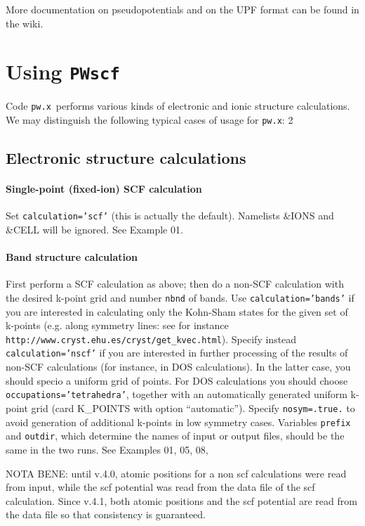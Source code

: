 \documentclass[12pt,a4paper]{article}
\def\pw.x{\texttt{pw.x}}
\def\PWscf{\texttt{PWscf}}
\begin{document}
More documentation on pseudopotentials and on the UPF format
can be found in the wiki.
\section{Using \PWscf}


Code \pw.x\ performs various kinds of electronic and ionic structure 
calculations.
We may distinguish the following typical cases of usage for \pw.x:
2
\subsection{Electronic structure calculations}
\paragraph{Single-point (fixed-ion) SCF calculation} 
Set \texttt{calculation='scf'} (this is actually the default).
Namelists \&IONS and \&CELL will be ignored. See Example 01.

\paragraph{Band structure calculation}
First perform a SCF calculation as above;
then do a non-SCF calculation with the desired k-point grid and 
number \texttt{nbnd} of bands. 
Use \texttt{calculation='bands'} if you are interested in calculating
only the Kohn-Sham states for the given set of k-points
(e.g. along symmetry lines: see for instance
\texttt{http://www.cryst.ehu.es/cryst/get\_kvec.html}). Specify instead
\texttt{calculation='nscf'} if you are interested in further processing 
of the results of non-SCF calculations (for instance, in DOS calculations).
In the latter case, you should specio a uniform grid of points.
For DOS calculations you should choose \texttt{occupations='tetrahedra'}, 
together with an automatically generated uniform k-point grid 
(card K\_POINTS with option ``automatic'').
Specify \texttt{nosym=.true.} to avoid generation of additional k-points in
low symmetry cases. Variables \texttt{prefix} and \texttt{outdir}, which determine
the names of input or output files, should be the same in the two runs.
See Examples 01, 05, 08,

NOTA BENE: until v.4.0, atomic positions for a non scf calculations 
were read from input, while the scf potential was read from the data file
of the scf calculation. Since v.4.1, both atomic positions and the scf
potential are read from the data file so that consistency is guaranteed.
\end{document}
